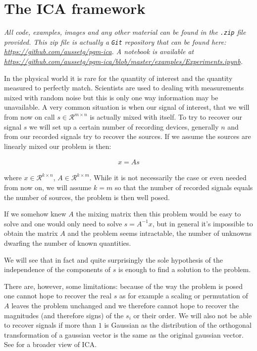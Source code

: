 \documentclass[a4paper,BCOR=5mm,oneside,openany]{scrreprt}
\begin{document}


\tableofcontents

\chapter{The ICA framework}

\emph{All code, examples, images and any other material can be found in the \texttt{.zip} file provided. This zip file is actually a \texttt{Git} repository that can be found here: \url{https://github.com/aussetg/pgm-ica}. A notebook is available at \url{https://github.com/aussetg/pgm-ica/blob/master/examples/Experiments.ipynb}.}

\vspace{1cm}

In the physical world it is rare for the quantity of interest and the quantity measured to perfectly match. Scientists are used to dealing with measurements mixed with random noise but this is only one way information may be unavailable.
A very common situation is when our signal of interest, that we will from now on call $s \in \mathcal{R}^{m \times n}$ is actually mixed with itself. To try to recover our signal $s$ we will set up a certain number of recording devices, generally $n$ and from our recorded signals try to recover the sources. If we assume the sources are linearly mixed our problem is then:

\begin{align*}
	x = A s
\end{align*}

where $x \in \mathcal{R}^{k \times n}$, $A \in \mathcal{R}^{k \times m}$. While it is not necessarily the case or even needed from now on, we will assume $k = m$ so that the number of recorded signals equals the number of sources, the problem is then well posed.

If we somehow knew $A$ the mixing matrix then this problem would be easy to solve and one would only need to solve $s = A^{-1} x$, but in general it's impossible to obtain the matrix $A$ and the problem seems intractable, the number of unknowns dwarfing the number of known quantities.

We will see that in fact and quite surprisingly the sole hypothesis of the independence of the components of $s$ is enough to find a solution to the problem. 

There are, however, some limitations: because of the way the problem is posed one cannot hope to recover the real $s$ as for example a scaling or permutation of $A$ leaves the problem unchanged and we therefore cannot hope to recover the magnitudes (and therefore signs) of the $s_i$ or their order. We will also not be able to recover signals if more than $1$ is Gaussian as the distribution of the orthogonal transformation of a gaussian vector is the same as the original gaussian vector. See \cite{Hyvarinen2001} for a broader view of ICA.
\end{document}
